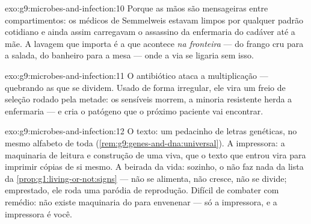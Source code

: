\begin{solution}{exo:g9:microbes-and-infection:10}
Porque as mãos são mensageiras entre compartimentos: os
médicos de Semmelweis estavam limpos por qualquer padrão
cotidiano e ainda assim carregavam o assassino da enfermaria
do cadáver até a mãe. A lavagem que importa é a que acontece
\emph{na fronteira} --- do frango cru para a salada, do
banheiro para a mesa --- onde a via se ligaria sem isso.
\end{solution}

\begin{solution}{exo:g9:microbes-and-infection:11}
O antibiótico ataca a multiplicação --- quebrando as
 que se dividem. Usado de forma irregular, ele vira
um freio de seleção rodado pela metade: os sensíveis morrem,
a minoria resistente herda a enfermaria --- e cria o patógeno
que o próximo paciente vai encontrar.
\end{solution}

\begin{solution}{exo:g9:microbes-and-infection:12}
O texto: um pedacinho de letras genéticas, no mesmo alfabeto
de toda  (\cref{rem:g9:genes-and-dna:universal}). A
impressora: a maquinaria de leitura e construção de uma
 viva, que o texto que entrou vira para imprimir cópias
de si mesmo. A beirada da vida: sozinho, o  não faz nada
da lista da \cref{prop:g1:living-or-not:signs} --- não se
alimenta, não cresce, não se divide; emprestado, ele roda uma
paródia de reprodução. Difícil de combater com remédio: não
existe maquinaria do  para envenenar --- só a
impressora, e a impressora é você.
\end{solution}

